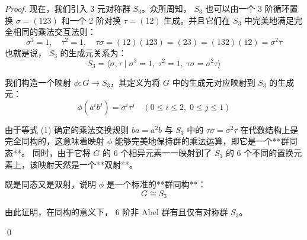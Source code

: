 \documentclass[]{article}
\begin{document}
\begin{proof}
现在，我们引入 3 元对称群 $S_3$。众所周知， $S_3$ 也可以由一个 3 阶循环置换 $\sigma = (123)$ 和一个 2 阶对换 $\tau = (12)$ 生成。并且它们在 $S_3$ 中完美地满足完全相同的乘法交互法则：
\[ \sigma^3 = 1, \quad \tau^2 = 1, \quad \tau \sigma = (12)(123) = (23) = (132)(12) = \sigma^2 \tau \]
也就是说， $S_3$ 的生成元关系为：
\[ S_3 = \langle \sigma, \tau \mid \sigma^3 = 1, \; \tau^2 = 1, \; \tau\sigma = \sigma^2\tau \rangle \]

我们构造一个映射 $\phi: G \longrightarrow S_3$，其定义为将 $G$ 中的生成元对应映射到 $S_3$ 的生成元：
\[ \phi(a^i b^j) = \sigma^i \tau^j \quad (0 \le i \le 2, \; 0 \le j \le 1) \]

由于等式 (1) 确定的乘法交换规则 $ba = a^2b$ 与 $S_3$ 中的 $\tau\sigma = \sigma^2\tau$ 在代数结构上是完全同构的，这意味着映射 $\phi$ 能够完美地保持群的乘法运算，即它是一个**群同态**。
同时，由于它将 $G$ 的 6 个相异元素一一映射到了 $S_3$ 的 6 个不同的置换元素上，该映射天然是一个**双射**。

既是同态又是双射，说明 $\phi$ 是一个标准的**群同构**：
\[ G \cong S_3 \]

由此证明，在同构的意义下， 6 阶非 Abel 群有且仅有对称群 $S_3$。

\qed


	
	
	
	
	
	
	
	
	
	
	
	
	
	
	
	
	
	
	
\end{proof}	
	
\end{document}
